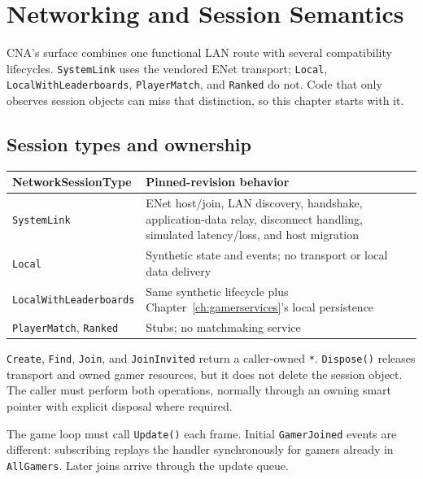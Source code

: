 \chapter{Networking and Session Semantics}
\label{ch:networking}

CNA's  surface combines one functional LAN route with
several compatibility lifecycles. \texttt{SystemLink} uses the vendored ENet transport;
\texttt{Local}, \texttt{LocalWithLeaderboards}, \texttt{PlayerMatch}, and \texttt{Ranked} do
not. Code that only observes session objects can miss that distinction, so this chapter starts
with it.

\section{Session types and ownership}

\begin{center}
\begin{tabularx}{\textwidth}{@{}lX@{}}
\toprule
\textbf{NetworkSessionType} & \textbf{Pinned-revision behavior} \\
\midrule
\texttt{SystemLink} & ENet host/join, LAN discovery, handshake, application-data relay,
disconnect handling, simulated latency/loss, and host migration \\
\texttt{Local} & Synthetic state and events; no transport or local data delivery \\
\texttt{LocalWithLeaderboards} & Same synthetic lifecycle plus Chapter~\ref{ch:gamerservices}'s
local persistence \\
\texttt{PlayerMatch}, \texttt{Ranked} & Stubs; no matchmaking service \\
\bottomrule
\end{tabularx}
\end{center}

\texttt{Create}, \texttt{Find}, \texttt{Join}, and \texttt{JoinInvited} return a
caller-owned \texttt{*}. \texttt{Dispose()} releases transport and
owned gamer resources, but it does not delete the session object. The caller must perform both
operations, normally through an owning smart pointer with explicit disposal where required.

The game loop must call \texttt{Update()} each frame. Initial \texttt{GamerJoined} events are
different: subscribing replays the handler synchronously for gamers already in
\texttt{AllGamers}. Later joins arrive through the update queue.

